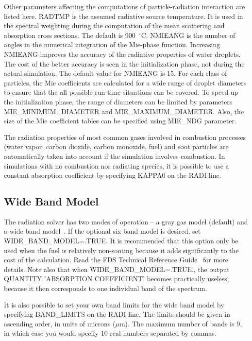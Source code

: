 \documentclass[11pt]{book}
\begin{document}
Other parameters affecting the computations of particle-radiation interaction are listed here. {\ct RADTMP} is the assumed radiative source temperature.
It is used in the spectral weighting during the computation of the mean scattering and absorption cross sections. The default is 900~$^\circ$C.
{\ct NMIEANG} is the number of angles in the numerical integration of the Mie-phase function.
Increasing {\ct NMIEANG} improves the accuracy of the radiative properties of water droplets. The cost
of the better accuracy is seen in the initialization phase, not during the actual simulation. The default value for {\ct NMIEANG}
is 15. For each class of particles, the Mie coefficients are calculated for a wide range of droplet diameters to ensure that the all possible run-time
situations can be covered. To speed up the initialization phase, the range of diameters can be limited by parameters {\ct MIE\_MINIMUM\_DIAMETER} and
{\ct MIE\_MAXIMUM\_DIAMETER}. Also, the size of the Mie coefficient tables can be specified using {\ct MIE\_NDG} parameter.

The radiation properties of most common gases involved in combustion processes (water vapor, carbon dioxide, carbon monoxide, fuel) and
soot particles are automatically taken into account if the simulation involves combustion. In simulations with no combustion nor radiating species, it is
possible to use a constant absorption coefficient by specifying {\ct KAPPA0} on the {\ct RADI} line.


\subsection{Wide Band Model}

\label{info:RADI_Wide_Band}

The radiation solver has two modes of
operation -- a gray gas model (default) and a wide band model~\cite{FDS_Math_Guide}.
If the optional six band model is desired,
set {\ct WIDE\_BAND\_MODEL=.TRUE.} It is recommended that this option
only be used when the fuel is relatively non-sooting because it
adds significantly to the cost of the calculation. Read the FDS Technical
Reference Guide~\cite{FDS_Tech_Guide} for more details. Note also that when
{\ct WIDE\_BAND\_MODEL=.TRUE.}, the output {\ct QUANTITY} {\ct 'ABSORPTION COEFFICIENT'}
becomes practically useless, because it then
corresponds to one individual band of the spectrum.

It is also possible to set your own band limits for the wide band model by specifying {\ct BAND\_LIMITS} on the {\ct RADI} line. The limits should be given in ascending order, in units of microns ($\mu$m). The maximum number of bands is 9, in which case you would specify 10 real numbers separated by commas.
\end{document}
